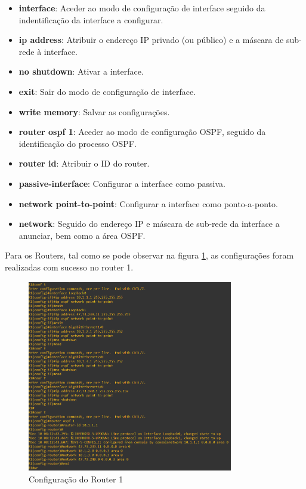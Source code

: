 \documentclass[11pt,english, openright, oneside]{book}
\begin{document}
\begin{itemize}
  \item \textbf{interface}: Aceder ao modo de configuração de interface seguido da indentificação da interface a configurar.
  \item \textbf{ip address}: Atribuir o endereço IP privado (ou público) e a máscara de sub-rede à interface.
  \item \textbf{no shutdown}: Ativar a interface.
  \item \textbf{exit}: Sair do modo de configuração de interface.
  \item \textbf{write memory}: Salvar as configurações. 
  \item \textbf{router ospf 1}: Aceder ao modo de configuração OSPF, seguido da identificação do processo OSPF.
  \item \textbf{router id}: Atribuir o ID do router.
  \item \textbf{passive-interface}: Configurar a interface como passiva.
  \item \textbf{network point-to-point}: Configurar a interface como ponto-a-ponto.
  \item \textbf{network}: Seguido do endereço IP e máscara de sub-rede da interface a anunciar, bem como a área OSPF.
\end{itemize}
\vspace{0.2cm}

\newpage
Para os Routers, tal como se pode observar na figura \ref{fig:config1}, as configurações foram realizadas com sucesso no router 1.
\vspace{0.2cm}

\begin{figure}[H]
  \centering
  \includegraphics[width=0.80\textwidth]{imagens/Tarefa1/1.configR1.png}
  \caption{Configuração do Router 1}
  \label{fig:config1}
\end{figure}
\vspace{0.2cm}
\end{document}
